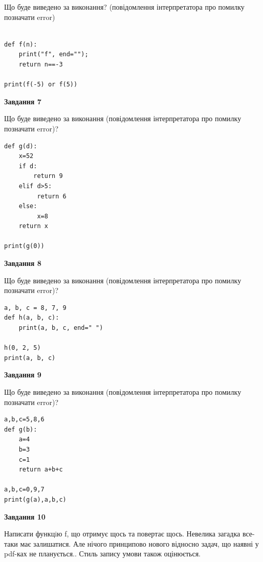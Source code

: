 \documentclass[12pt, ukrainian]{article}
\begin{document}
{\begin {large}
Що буде виведено за виконання? (повідомлення інтерпретатора про помилку позначати error)\par
\begin{verbatim}

def f(n):
    print("f", end="");
    return n==-3

print(f(-5) or f(5))
\end{verbatim}

{\begin {center}\textbf{Завдання 7}\end {center}}

Що буде виведено за виконання (повідомлення інтерпретатора про помилку позначати error)?\par
\begin{verbatim}
def g(d):
    x=52
    if d: 
        return 9
    elif d>5:
         return 6
    else:
         x=8
    return x

print(g(0))
\end{verbatim}

{\begin {center}\textbf{Завдання 8}\end {center}}

Що буде виведено за виконання (повідомлення інтерпретатора про помилку позначати error)?\par
\begin{verbatim}
a, b, c = 8, 7, 9
def h(a, b, c):
    print(a, b, c, end=" ")

h(0, 2, 5)
print(a, b, c)
\end{verbatim}

{\begin {center}\textbf{Завдання 9}\end {center}}

Що буде виведено за виконання (повідомлення інтерпретатора про помилку позначати error)?\par
\begin{verbatim}
a,b,c=5,8,6
def g(b):
    a=4
    b=3
    c=1
    return a+b+c

a,b,c=0,9,7
print(g(a),a,b,c)
\end{verbatim}

{\begin {center}\textbf{Завдання 10}\end {center}}


Написати функцiю f, що отримує щось та повертає щось. Невелика загадка все-таки має залишатися. Але нічого принципово нового відносно задач, що наявні у pdf-ках не планується.. Стиль запису умови також оцінюється.\par
\end {large}}
\newpage
\end{document}
